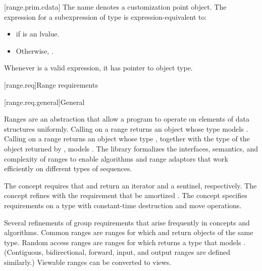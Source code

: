 [range.prim.cdata]{}
\pnum
The name  denotes a customization point
object. The expression
 for a subexpression  of type 
is expression-equivalent to:
\begin{itemize}
\item {} if  is an lvalue.

\item Otherwise, .
\end{itemize}

\pnum
\begin{note}
Whenever  is a valid expression, it
has pointer to object type.
\end{note}

[range.req]{Range requirements}

[range.req.general]{General}

\pnum
Ranges are an abstraction that allow a \Cpp{} program
to operate on elements of data structures uniformly.
Calling  on a range returns an object
whose type models .
Calling  on a range returns an object whose type ,
together with the type  of the object returned by ,
models .
The library formalizes the interfaces, semantics, and complexity of ranges
to enable algorithms and range adaptors that work efficiently
on different types of sequences.

\pnum
The  concept requires that
 and 
return an iterator and a sentinel, respectively.
The  concept refines  with
the requirement that  be amortized .
The  concept specifies requirements on a  type
with constant-time destruction and move operations.

\pnum
Several refinements of  group requirements
that arise frequently in concepts and algorithms.
Common ranges are ranges for which
 and 
return objects of the same type.
Random access ranges are ranges for which 
returns a type that models
.
(Contiguous, bidirectional, forward, input, and output ranges
are defined similarly.)
Viewable ranges can be converted to views.

